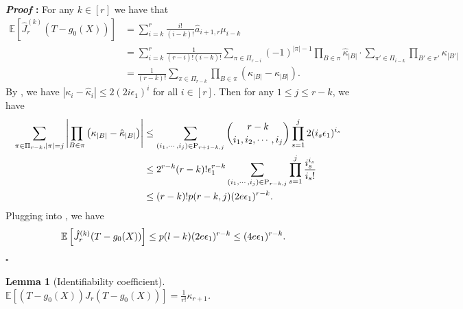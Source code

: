 \documentclass{article}
\def\eps{{\epsilon}}
\newcommand{\E}{\mathbb{E}}
\newtheorem{lemma}{Lemma}[section]
\renewenvironment{proof}{\noindent\textbf{\textit{Proof }:}}{\hfill$\square$}
\begin{document}
\begin{proof}
    For any $k\in[r]$ we have that
    \begin{equation}
        \label{eq:good-test-func-kth-derivative}
        \begin{aligned}
            \E\left[\hat{J}_r^{(k)}(T-g_0(X))\right] 
            &= \sum_{i=k}^{r} \frac{i!}{(i-k)!} \hat{a}_{i+1,r} \mu_{i-k} \\
            &= \sum_{i=k}^{r} \frac{1}{(r-i)!(i-k)!} \sum_{\pi\in\Pi_{r-i}} (-1)^{|\pi|-1} \prod_{B\in\pi}\hat{\kappa}_{|B|} \cdot \sum_{\pi'\in\Pi_{i-k}}\prod_{B'\in\pi'} \kappa_{|B'|}\\
            &= \frac{1}{(r-k)!} \sum_{\pi\in\Pi_{r-k}} \prod_{B\in\pi} \left(\kappa_{|B|}-\hat{\kappa}_{|B|}\right).
        \end{aligned}
    \end{equation}
    By , we have $|\kappa_i-\hat{\kappa}_i|\leq 2(2i\eps_1)^i$ for all $i\in[r]$.
    Then for any $1\leq j\leq r-k$, we have
    \begin{equation}
        \notag
        \begin{aligned}
            \sum_{\pi\in\Pi_{r-k}, |\pi|=j} \left|\prod_{B\in\pi} \left(\kappa_{|B|}-\hat{\kappa}_{|B|}\right)\right| 
            &\leq \sum_{(i_1,\cdots,i_j)\in\mathrm{P}_{r+1-k,j}} \binom{r-k}{i_1,i_2,\cdots,i_j} \prod_{s=1}^j 2(i_s\eps_1)^{i_s} \\
            &\leq 2^{r-k} (r-k)! \eps_1^{r-k}  \sum_{(i_1,\cdots,i_j)\in\mathrm{P}_{r-k,j}}\prod_{s=1}^j \frac{i_s^{i_s}}{i_s!}  \\
            &\leq (r-k)! p(r-k,j) (2e\eps_1)^{r-k}.
        \end{aligned} 
    \end{equation}
    Plugging into , we have
    \begin{equation}
        \notag
        \begin{aligned}
            \E\left[\hat{J}_r^{(k)}(T-g_0(X))\right] &\leq  p(l-k) (2e\eps_1)^{r-k} \leq (4e\eps_1)^{r-k}.
        \end{aligned}
    \end{equation}
\end{proof}


\begin{lemma}[Identifiability coefficient]
    \label{lemma:cumulant-equiv-expression}
    $\E[(T-g_0(X))J_r(T-g_0(X))] = \frac{1}{r!} \kappa_{r+1}$.
\end{lemma}
\end{document}
